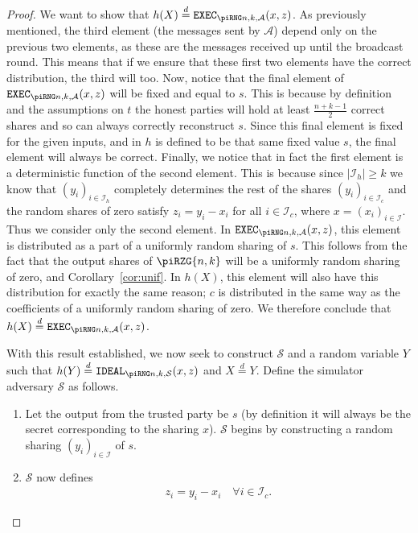 \documentclass{article}
\newcommand{\eqd}[0]{\stackrel{d}{=}}
\theoremstyle{remark}
\begin{document}
\begin{proof}
	We want to show that $h(X) \eqd \execD$. As previously mentioned, the third
	element (the messages sent by $\mathcal{A}$) depend only on the previous
	two elements, as these are the messages received up until the broadcast
	round. This means that if we ensure that these first two elements have the
	correct distribution, the third will too. Now, notice that the final
	element of $\execD$ will be fixed and equal to $s$. This is because by
	definition and the assumptions on $t$ the honest parties will hold at least
	$\frac{n + k - 1}{2}$ correct shares and so can always correctly
	reconstruct $s$. Since this final element is fixed for the given inputs,
	and in $h$ is defined to be that same fixed value $s$, the final element
	will always be correct. Finally, we notice that in fact the first element
	is a deterministic function of the second element. This is because since
	$|\mathcal{I}_h| \ge k$ we know that ${(y_i)}_{i \in \mathcal{I}_h}$
	completely determines the rest of the shares ${(y_i)}_{i \in
	\mathcal{I}_c}$ and the random shares of zero satisfy $z_i = y_i - x_i$ for
	all $i \in \mathcal{I}_c$, where $x = {(x_i)}_{i \in \mathcal{I}}$. Thus we
	consider only the second element. In $\execD$, this element is distributed
	as a part of a uniformly random sharing of $s$. This follows from the fact
	that the output shares of $\piRZG{n,k}$ will be a uniformly random sharing
	of zero, and Corollary~\ref{cor:unif}. In $h(X)$, this element will also
	have this distribution for exactly the same reason; $c$ is distributed in
	the same way as the coefficients of a uniformly random sharing of zero. We
	therefore conclude that $h(X) \eqd \execD$.

	With this result established, we now seek to construct $\mathcal{S}$ and a
	random variable $Y$ such that $h(Y) \eqd \idealD$ and $X \eqd Y$. Define
	the simulator adversary $\mathcal{S}$ as follows.

	\begin{enumerate}
		\item\label{enum:openGen} Let the output from the trusted party be
			$s$ (by definition it will always be the secret corresponding to
			the sharing $x$). $\mathcal{S}$ begins by constructing a random
			sharing ${(y_i)}_{i \in \mathcal{I}}$ of $s$.

		\item $\mathcal{S}$ now defines
			\begin{align*}
				z_i = y_i - x_i \quad \forall i \in \mathcal{I}_c.
			\end{align*}


\end{enumerate}
\end{proof}
\end{document}
